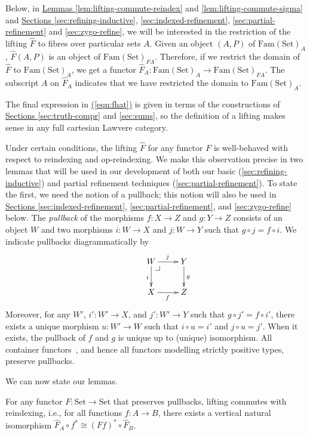\documentclass{LMCS}
\makeatletter
\newcommand{\Fam}{\mathrm{Fam}}
\newcommand{\Set}{\mathrm{Set}}
\newcommand{\parenref}[1]{\hyperref[#1]{(\ref*{#1})}}
\newcommand{\pullbackcorner}[1][dr]{\save*!/#1-1.2pc/#1:(-1,1)@^{|-}\restore}
\makeatother
\begin{document}
Below, in \hyperref[lem:lifting-commute-reindex]{Lemmas
  \ref*{lem:lifting-commute-reindex}} and
\ref{lem:lifting-commute-sigma} and
\hyperref[sec:refining-inductive]{Sections
  \ref*{sec:refining-inductive}}, \ref{sec:indexed-refinement},
\ref{sec:partial-refinement} and \ref{sec:zygo-refine}, we will be
interested in the restriction of the lifting $\hat{F}$ to fibres over
particular sets $A$. Given an object $(A,P)$ of $\Fam(\Set)_A$,
$\hat{F}(A,P)$ is an object of $\Fam(\Set)_{FA}$. Therefore, if we
restrict the domain of $\hat{F}$ to $\Fam(\Set)_A$, we get a functor
$\hat{F}_A : \Fam(\Set)_A \to \Fam(\Set)_{FA}$. The subscript $A$ on
$\hat{F}_A$ indicates that we have restricted the domain to
$\Fam(\Set)_A$.

The final expression in \parenref{eqn:fhat} is given in terms of the
constructions of \hyperref[sec:truth-compr]{Sections
  \ref*{sec:truth-compr}} and \hyperref[sec:sums]{ \ref*{sec:sums}},
so the definition of a lifting makes sense in any full cartesian
Lawvere category.

Under certain conditions, the lifting $\hat{F}$ for any functor $F$ is
well-behaved with respect to reindexing and op-reindexing. We make
this observation precise in two lemmas that will be used in our
development of both our basic (\autoref{sec:refining-inductive}) and
partial refinement techniques (\autoref{sec:partial-refinement}). To
state the first, we need the notion of a pullback; this notion will
also be used in \hyperref[sec:indexed-refinement]{Sections
  \ref*{sec:indexed-refinement}}, \hyperref[sec:partial-refinement]{
  \ref*{sec:partial-refinement}}, and \hyperref[sec:zygo-refine]{
  \ref*{sec:zygo-refine}} below. The {\em pullback} of the morphisms
$f : X \to Z$ and $g : Y \to Z$ consists of an object $W$ and two
morphisms $i : W \to X$ and $j : W \to Y$ such that $g \circ j = f
\circ i$.  We indicate pullbacks diagrammatically by
\[\xymatrix{ & W \ar[d]_{i} \ar[r]^{j} \pullbackcorner &
  \ar[d]^g Y \\
  &X \ar[r]_f &Z}\]
Moreover, for any $W'$, $i': W' \to X$, and $j': W' \to Y$ such that
$g \circ j' = f \circ i'$, there exists a unique morphism $u : W' \to
W$ such that $i \circ u = i'$ and $j \circ u = j'$.  When it exists,
the pullback of $f$ and $g$ is unique up to (unique) isomorphism.  All
container functors~\cite{DBLP:conf/fossacs/AbbottAG03}, and hence all
functors modelling strictly positive types, preserve pullbacks.

We can now state our lemmas.

\begin{lem}\label{lem:lifting-commute-reindex}
  For any functor $F : \Set \to \Set$ that preserves pullbacks,
  lifting commutes with reindexing, i.e., for all functions $f : A \to
  B$, there exists a vertical natural isomorphism $\hat{F}_A \circ f^*
  \cong (Ff)^* \circ \hat{F}_B$.
\end{lem}
\end{document}
